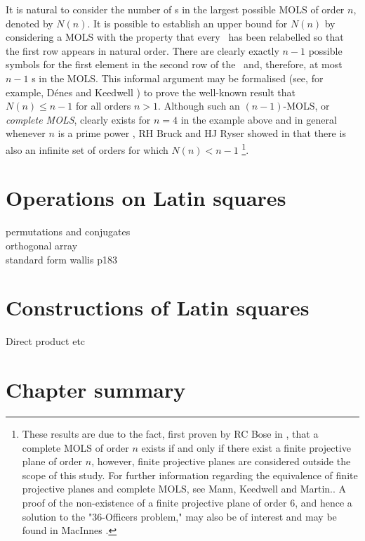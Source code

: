  It is natural to consider the number of \lat s in the largest possible MOLS of order $n$, denoted by $N(n)$. It is possible to establish an upper bound for $N(n)$ by considering a MOLS with the property that every \lat \ has been relabelled so that the first row appears in natural order. There are clearly exactly $n-1$ possible symbols for the first element in the second row of the \lat \ and, therefore, at most $n-1$ \lat s in the MOLS. This informal argument may  be formalised (see, for example, D\'enes and Keedwell \cite[Theorem 5.1.5]{denes1}) to prove the well-known result that $N(n) \leq n-1$ for all orders  $n>1$. Although such an $(n-1)$-MOLS, or \emph{complete MOLS}, clearly exists for $n = 4$ in the example above and in general whenever $n$ is a prime power \cite{}, RH Bruck and HJ Ryser showed in \cite{bruck} that there is also an infinite set of orders for which $N(n) <n-1$  \footnote{These results are due to the fact, first proven by RC Bose in \cite{bosepp}, that a complete MOLS of order $n$ exists if and only if there exist  a finite projective plane of order $n$, however, finite projective planes are considered outside the scope of this study. For further information regarding the equivalence of finite projective planes and complete MOLS, see Mann, Keedwell and Martin.\cite{mann}.  A proof of the non-existence of a finite projective plane of order 6, and hence a solution to the "36-Officers problem," may also be of interest and may be found in MacInnes \cite{McInnes}.}.
    

 
\section{Operations on Latin squares}

permutations and conjugates\\
orthogonal array\\

standard form wallis p183

\section{Constructions of Latin squares}
Direct product etc

\section{Chapter summary}
